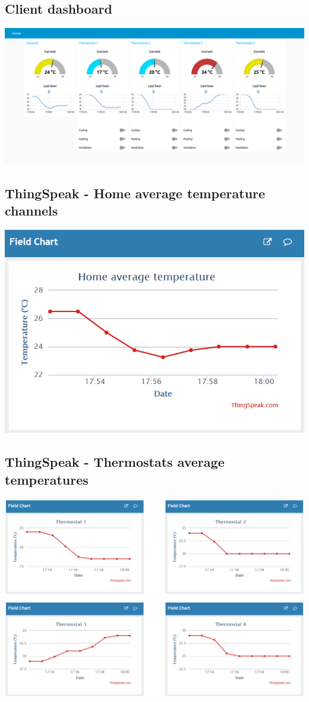 \documentclass[12pt,a4paper]{report}
\begin{document}
\subsection*{Client dashboard}
\begin{center}
    \includegraphics[width=\linewidth]{images/dashboard.png}
\end{center}

\subsection*{ThingSpeak - Home average temperature channels}
\begin{center}
    \includegraphics[width=0.5\linewidth]{images/thingspeak-home.png}
\end{center}

\subsection*{ThingSpeak - Thermostats average temperatures}
\begin{center}
    \includegraphics[width=0.8\linewidth]{images/thingspeak-thermostats.png}
\end{center}
\end{document}

